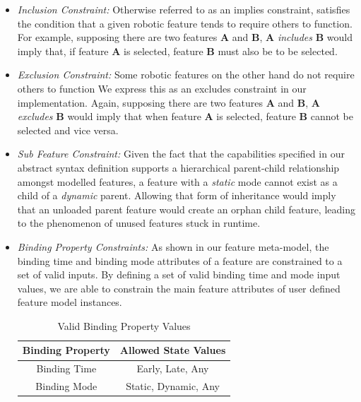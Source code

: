 \documentclass[conference]{IEEEtran}
\begin{document}
\begin{itemize}
    \item \textit{Inclusion Constraint: }
    Otherwise referred to as an implies constraint, satisfies the condition that a given robotic feature tends to require others to function. For example, supposing there are two features \textbf{A} and \textbf{B}, \textbf{A} \textit{includes} \textbf{B} would imply that, if feature \textbf{A} is selected, feature \textbf{B} must also be to be selected.
    
    \item \textit{Exclusion Constraint: }
    Some robotic features on the other hand do not require others to function We express this as an excludes constraint in our implementation. Again, supposing there are two features \textbf{A} and \textbf{B}, \textbf{A} \textit{excludes} \textbf{B} would imply that when feature \textbf{A} is selected, feature \textbf{B} cannot be selected and vice versa.
    
    
    \item \textit{Sub Feature Constraint: }
    Given the fact that the capabilities specified in our abstract syntax definition supports a hierarchical parent-child relationship amongst modelled features, a feature with a \textit{static} mode cannot exist as a child of a \textit{dynamic} parent. Allowing that form of inheritance would imply that an unloaded parent feature would create an orphan child feature, leading to the phenomenon of unused features stuck in runtime. 
    

\item \textit{Binding Property Constraints: }
As shown in our feature meta-model, the binding time and binding mode attributes of a feature are constrained to a set of valid inputs. By defining a set of valid binding time and mode input values, we are able to constrain the main feature attributes of user defined feature model instances.

\begin{table}[htbp]
\caption{Valid Binding Property Values}
\begin{center}
\begin{tabular}{|c|c|}
\hline
    Binding Property & Allowed State Values  \\ \hline
    Binding Time & Early, Late, Any \\ \hline
    Binding Mode & Static, Dynamic, Any\\ \hline
\end{tabular}
\label{tab:bpropcon}
\end{center}
\end{table}


\end{itemize}
\end{document}
